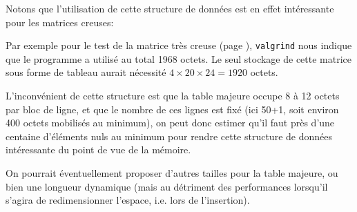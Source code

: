 	Notons que l'utilisation de cette structure de données est en effet intéressante pour les matrices creuses:
	
	Par exemple pour le test de la matrice très creuse (page \pageref{subs:mat_creuse}), \texttt{valgrind} nous indique que le programme a utilisé au total 1968 octets. Le seul stockage de cette matrice sous forme de tableau aurait nécessité $4 \times 20 \times 24 = 1920$ octets. 

	L'inconvénient de cette structure est que la table majeure occupe 8 à 12 octets par bloc de ligne, et que le nombre de ces lignes est fixé (ici 50+1, soit environ 400 octets mobilisés au minimum), on peut donc estimer qu'il faut près d'une centaine d'éléments nuls au minimum pour rendre cette structure de données intéressante du point de vue de la mémoire. 

	On pourrait éventuellement proposer d'autres tailles pour la table majeure, ou bien une longueur dynamique (mais au détriment des performances lorsqu'il s'agira de redimensionner l'espace, i.e. lors de l'insertion).
